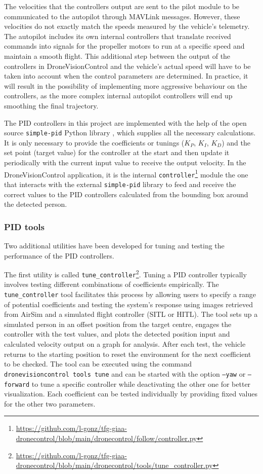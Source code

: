 The velocities that the controllers output are sent to the pilot module to be communicated to the autopilot through MAVLink messages. However, these velocities do not exactly match the speeds measured by the vehicle's telemetry. The autopilot includes its own internal controllers that translate received commands into signals for the propeller motors to run at a specific speed and maintain a smooth flight. This additional step between the output of the controllers in DroneVisionControl and the vehicle's actual speed will have to be taken into account when the control parameters are determined. In practice, it will result in the possibility of implementing more aggressive behaviour on the controllers, as the more complex internal autopilot controllers will end up smoothing the final trajectory.

The PID controllers in this project are implemented with the help of the open source \texttt{simple-pid} Python library \cite{pid-library}, which supplies all the necessary calculations.
It is only necessary to provide the coefficients or tunings ($K_P$, $K_I$, $K_D$) and the set point (target value) for the controller at the start and then update it periodically with the current input value to receive the output velocity.
In the DroneVisionControl application, it is the internal \texttt{controller}\footnote{\url{https://github.com/l-gonz/tfg-giaa-dronecontrol/blob/main/dronecontrol/follow/controller.py}} module the one that interacts with the external \texttt{simple-pid} library to feed and receive the correct values to the PID controllers calculated from the bounding box around the detected person.

\subsubsection{PID tools}
Two additional utilities have been developed for tuning and testing the performance of the PID controllers.

The first utility is called \texttt{tune\_controller}\footnote{\url{https://github.com/l-gonz/tfg-giaa-dronecontrol/blob/main/dronecontrol/tools/tune_controller.py}}. Tuning a PID controller typically involves testing different combinations of coefficients empirically. The \texttt{tune\_controller} tool facilitates this process by allowing users to specify a range of potential coefficients and testing the system's response using images retrieved from AirSim and a simulated flight controller (SITL or HITL). The tool sets up a simulated person in an offset position from the target centre, engages the controller with the test values, and plots the detected position input and calculated velocity output on a graph for analysis. After each test, the vehicle returns to the starting position to reset the environment for the next coefficient to be checked. The tool can be executed using the command \texttt{dronevisioncontrol tools tune} and can be started with the option \texttt{--yaw} or \texttt{--forward} to tune a specific controller while deactivating the other one for better visualization. Each coefficient can be tested individually by providing fixed values for the other two parameters.

